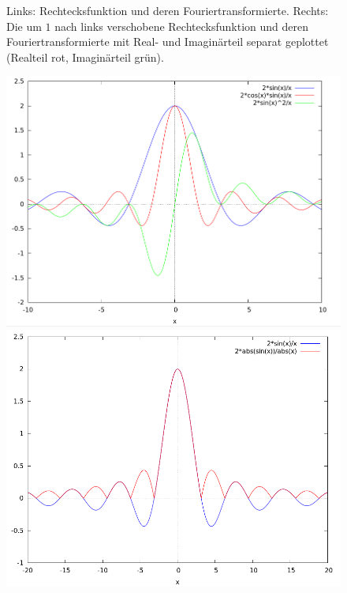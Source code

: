 \begin{remark}
\begin{enumerate}
\begin{figure}[ht]
      \caption{Links: Rechtecksfunktion und deren Fouriertransformierte. Rechts: Die um $ 1 $
        nach links verschobene Rechtecksfunktion und deren Fouriertransformierte mit Real- und 
        Imaginärteil separat geplottet (Realteil rot, Imaginärteil grün).}
      \label{fig:Rechteck12}
    \end{figure}
    \begin{figure}[ht]
      \centering
      \begin{minipage}{0.49\linewidth}
        \centering
        \includegraphics[width=\linewidth]{Bilder/Rechteck3}
      \end{minipage}
      \begin{minipage}{0.49\linewidth}
        \centering
        \includegraphics[width=\linewidth]{Bilder/Rechteck4}

\end{minipage}
\end{figure}
\end{enumerate}
\end{remark}
